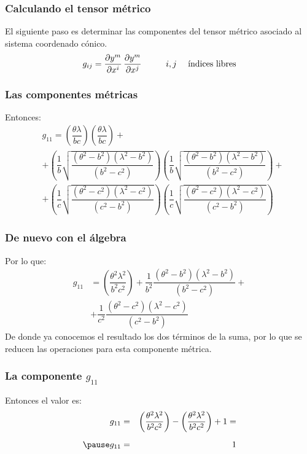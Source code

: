 \documentclass[12pt]{beamer}
\begin{document}
\begin{frame}
\frametitle{Calculando el tensor métrico}
El siguiente paso es determinar las componentes del tensor métrico asociado al sistema coordenado cónico.
\\
\bigskip
\pause
\begin{align*}
g_{ij} = \pdv{y^{m}}{x^{i}} \, \pdv{y^{m}}{x^{j}} \hspace{1cm} i, j \quad \mbox{ índices libres}
\end{align*}
\end{frame}
\begin{frame}
\frametitle{Las componentes métricas}
Entonces:
\pause
\begin{align*}
&g_{11} = \left( \dfrac{\theta \lambda}{b c} \right) \left( \dfrac{\theta \lambda}{b c} \right) + \\[0.5em] 
&+ \left( \dfrac{1}{b} \sqrt{\dfrac{(\theta^{2} {-} b^{2})(\lambda^{2} {-} b^{2})}{(b^{2} {-} c^{2})}} \right) \left( \dfrac{1}{b} \sqrt{\dfrac{(\theta^{2} {-} b^{2})(\lambda^{2} {-} b^{2})}{(b^{2} {-} c^{2})}} \right) + \\[0.5em] 
&+ \left( \dfrac{1}{c} \sqrt{\dfrac{(\theta^{2} {-} c^{2})(\lambda^{2} {-} c^{2})}{(c^{2} {-} b^{2})}} \right) \left( \dfrac{1}{c} \sqrt{\dfrac{(\theta^{2} {-} c^{2})(\lambda^{2} {-} c^{2})}{(c^{2} {-} b^{2})}} \right)
\end{align*}
\end{frame}
\begin{frame}
\frametitle{De nuevo con el álgebra}
Por lo que:
\pause
\begin{align*}
g_{11} &= \left( \dfrac{\theta^{2} \lambda^{2}}{b^{2} c^{2}} \right) + \dfrac{1}{b^{2}} \dfrac{(\theta^{2} {-} b^{2})(\lambda^{2} {-} b^{2})}{(b^{2} {-} c^{2})} + \\[0.5em] 
&+ \dfrac{1}{c^{2}} \dfrac{(\theta^{2} {-} c^{2})(\lambda^{2} {-} c^{2})}{(c^{2} {-} b^{2})}
\end{align*}
\pause
De donde ya conocemos el resultado los dos términos de la suma, por lo que se reducen las operaciones para esta componente métrica.
\end{frame}
\begin{frame}
\frametitle{La componente $g_{11}$}
Entonces el valor es:
\pause
\begin{eqnarray*}
g_{11} &=& \left( \dfrac{\theta^{2} \lambda^{2}}{b^{2} c^{2}} \right) - \left( \dfrac{\theta^{2} \lambda^{2}}{b^{2} c^{2}} \right) + 1 = \\[0.5em] \pause
g_{11} &=& 1
\end{eqnarray*}
\end{frame}
\end{document}
